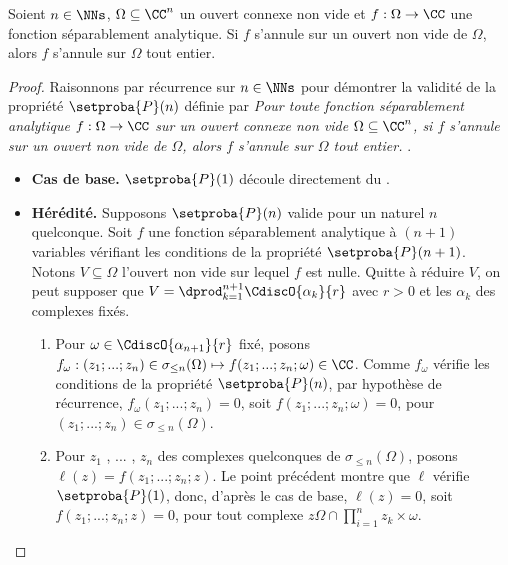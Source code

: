 \begin{fact} \label{multi-isolated-zero}
    Soient $n \in \NNs$,
    $\Omega \subseteq \CC^n$ un ouvert connexe non vide
    et
    $f: \Omega \rightarrow \CC$ une fonction séparablement analytique.
	Si $f$ s'annule sur un ouvert non vide de $\Omega$,
	alors $f$ s'annule sur $\Omega$ tout entier. 
\end{fact}


\begin{proof}
	Raisonnons par récurrence sur $n \in \NNs$ pour démontrer la validité de la propriété $\setproba{P}(n)$ définie par
	\emph{\og 
		Pour toute fonction séparablement analytique $f: \Omega \rightarrow \CC$ sur un ouvert connexe non vide $\Omega \subseteq \CC^n$,
		si $f$ s'annule sur un ouvert non vide de $\Omega$,
		alors $f$ s'annule sur $\Omega$ tout entier. 
	\fg}\kern2pt.
	\begin{itemize}[label=\small\textbullet]
		\item \textbf{Cas de base.}
		$\setproba{P}(1)$ découle directement du .


		\item \textbf{Hérédité.}
		Supposons $\setproba{P}(n)$ valide pour un naturel $n$ quelconque.
		Soit $f$ une fonction séparablement analytique à $(n + 1)$ variables vérifiant les conditions de la propriété $\setproba{P}(n + 1)$.
		Notons $V \subseteq \Omega$ l'ouvert non vide sur lequel $f$ est nulle.
		Quitte à réduire $V$, on peut supposer que
		$V = \dprod_{k=1}^{n+1} \CdiscO{\alpha_k}{r}$
		avec $r > 0$ et les $\alpha_k$ des complexes fixés.
		\begin{enumerate}
		    \item Pour $\omega \in \CdiscO{\alpha_{n+1}}{r}$ fixé,
		    posons
		    $f_\omega: (z_1 ; ... ; z_n) \in \sigma_{\leq n}(\Omega) \mapsto f(z_1 ; ... ; z_n ; \omega) \in \CC$.
		    Comme $f_\omega$ vérifie les conditions de la propriété $\setproba{P}(n)$, par hypothèse de récurrence,
		    $f_\omega(z_1 ; ... ; z_n) = 0$, 
		    soit $f(z_1 ; ... ; z_n ; \omega) = 0$,
		    pour $(z_1 ; ... ; z_n) \in \sigma_{\leq n}(\Omega)$.


		    \item Pour $z_1$ , ... , $z_n$ des complexes quelconques de $\sigma_{\leq n}(\Omega)$,
		    posons $\ell(z) = f(z_1 ; ... ; z_n ; z)$.
		    Le point précédent montre que $\ell$ vérifie $\setproba{P}(1)$,
		    donc, d'après le cas de base,
		    $\ell(z) = 0$,
		    soit $f(z_1 ; ... ; z_n ; z) = 0$,
		    pour tout complexe $z \Omega \cap \prod_{i=1}^n {z_k} \times {\omega}$.



\end{enumerate}
\end{itemize}
\end{proof}
